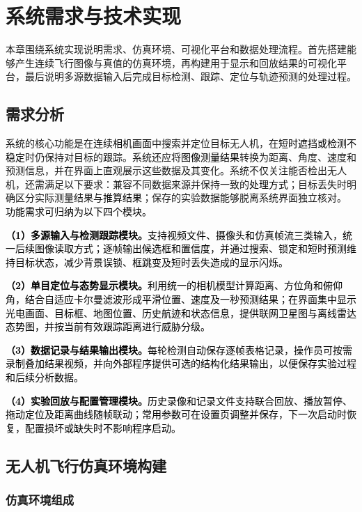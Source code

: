 
\chapter{系统需求与技术实现}

本章围绕系统实现说明需求、仿真环境、可视化平台和数据处理流程。首先搭建能够产生连续飞行图像与真值的仿真环境，再构建用于显示和回放结果的可视化平台，最后说明多源数据输入后完成目标检测、跟踪、定位与轨迹预测的处理过程。

\section{需求分析}

系统的核心功能是在连续\textcolor{black}{相机画面}中搜索并定位目标无人机，在\textcolor{black}{短时遮挡或检测不稳定}时仍保持对目标的跟踪。系统还应将\textcolor{black}{图像测量结果}转换为距离、角度、速度和预测信息，并在界面上直观展示这些数据及其变化。系统不仅关注能否检出无人机，还需满足以下要求：兼容不同数据来源并保持一致的\textcolor{black}{处理方式}；目标丢失时明确区分实际测量结果与\textcolor{black}{推算结果}；保存的实验数据能够脱离系统界面独立核对。
\textcolor{black}{功能需求可归纳为以下四个模块。}

\textcolor{black}{\textbf{（1）多源输入与检测跟踪模块。}支持视频文件、摄像头和仿真帧流三类输入，统一后续图像读取方式；逐帧输出候选框和置信度，并通过搜索、锁定和短时预测维持目标状态，减少背景误锁、框跳变及短时丢失造成的显示闪烁。}

\textcolor{black}{\textbf{（2）单目定位与态势显示模块。}利用统一的相机模型计算距离、方位角和俯仰角，结合自适应卡尔曼滤波形成平滑位置、速度及一秒预测结果；在界面集中显示光电画面、目标框、地图位置、历史航迹和状态信息，提供联网卫星图与离线雷达态势图，并按当前有效跟踪距离进行威胁分级。}

\textcolor{black}{\textbf{（3）数据记录与结果输出模块。}每轮检测自动保存逐帧表格记录，操作员可按需录制叠加结果视频，并向外部程序提供可选的结构化结果输出，以便保存实验过程和后续分析数据。}

\textcolor{black}{\textbf{（4）实验回放与配置管理模块。}历史录像和记录文件支持联合回放、播放暂停、拖动定位及距离曲线随帧联动；常用参数可在设置页调整并保存，下一次启动时恢复，配置损坏或缺失时不影响程序启动。}

\section{无人机飞行仿真环境构建}

\subsection{仿真环境组成}

